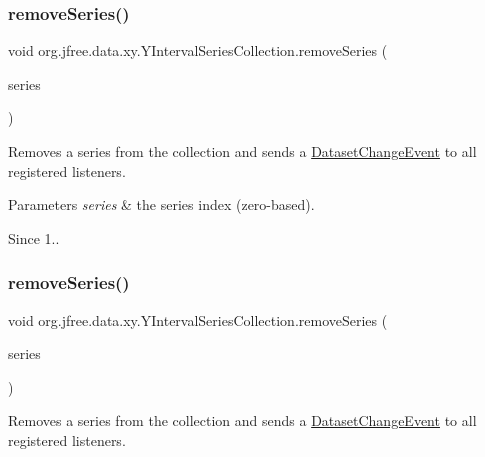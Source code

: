 \subsubsection{\texorpdfstring{remove\+Series()}{removeSeries()}\hspace{0.1cm}{\footnotesize\ttfamily [1/2]}}
{\footnotesize\ttfamily void org.\+jfree.\+data.\+xy.\+Y\+Interval\+Series\+Collection.\+remove\+Series (\begin{DoxyParamCaption}\item[{int}]{series }\end{DoxyParamCaption})}

Removes a series from the collection and sends a \mbox{\hyperlink{}{Dataset\+Change\+Event}} to all registered listeners.


\begin{DoxyParams}{Parameters}
{\em series} & the series index (zero-\/based).\\
\hline
\end{DoxyParams}
\begin{DoxySince}{Since}
1.. 
\end{DoxySince}
\mbox{\label{classorg_1_1jfree_1_1data_1_1xy_1_1_y_interval_series_collection_a3adb1606c093878d5141bd93f5658a7d}} 
\subsubsection{\texorpdfstring{remove\+Series()}{removeSeries()}\hspace{0.1cm}{\footnotesize\ttfamily [2/2]}}
{\footnotesize\ttfamily void org.\+jfree.\+data.\+xy.\+Y\+Interval\+Series\+Collection.\+remove\+Series (\begin{DoxyParamCaption}\item[{\mbox{\hyperlink{classorg_1_1jfree_1_1data_1_1xy_1_1_y_interval_series}{Y\+Interval\+Series}}}]{series }\end{DoxyParamCaption})}

Removes a series from the collection and sends a \mbox{\hyperlink{}{Dataset\+Change\+Event}} to all registered listeners.


